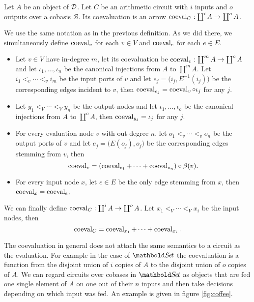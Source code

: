 \begin{definition}
  \label{def:coeval}
  Let $A$ be an object of $\mathcal{D}$.  Let $C$ be an arithmetic circuit with
  $i$ inputs and $o$ outputs over a cobasis $\mathcal{B}$. Its
  coevaluation is an arrow $\operatorname{coeval}_C:\coprod^iA\rightarrow\coprod^oA$.

  We use the same notation as in the previous definition. As we did
  there, we simultaneously define $\operatorname{coeval}_v$ for each $v\in V$ and
  $\operatorname{coeval}_e$ for each $e\in E$.
  \begin{itemize}
  \item Let $v\in V$ have in-degree $m$, let its coevaluation be
    $\operatorname{coeval}_v:\coprod^mA\rightarrow\coprod^oA$ and let $\iota_1,\ldots,\iota_n$ be the
    canonical injections from $A$ to $\coprod^mA$. Let $i_1<_v\cdots<_vi_m$
    be the input ports of $v$ and let
    $e_j=\bigl(i_j,E^{-1}(i_j)\bigr)$ be the corresponding edges
    incident to $v$, then $\operatorname{coeval}_{e_j} = \operatorname{coeval}_v\circ\iota_j$ for any
    $j$.
  \item Let $y_1<_V\cdots<_Vy_n$ be the output nodes and let
    $\iota_1,\ldots,\iota_o$ be the canonical injections from $A$ to
    $\coprod^oA$, then $\operatorname{coeval}_{y_j}=\iota_j$ for any $j$.
  \item For every evaluation node $v$ with out-degree $n$, let
    $o_1<_v\cdots<_vo_n$ be the output ports of $v$ and let
    $e_j=\bigl(E(o_j),o_j\bigr)$ be the corresponding edges
    stemming from $v$, then
    \begin{equation}
      \label{eq:lave_v}
      \operatorname{coeval}_v = (\operatorname{coeval}_{e_1}+\cdots+\operatorname{coeval}_{e_n}) \circ \beta(v) 
      \text{.}
    \end{equation}
  \item For every input node $x$, let $e\in E$ be the only edge
    stemming from $x$, then $\operatorname{coeval}_x=\operatorname{coeval}_e$.
  \end{itemize}

  We can finally define $\operatorname{coeval}_C:\coprod^iA\rightarrow\coprod^oA$. Let
  $x_1<_V\cdots<_Vx_i$ be the input nodes, then
  \begin{equation}
    \label{eq:lave}
    \operatorname{coeval}_C = \operatorname{coeval}_{x_1}+\cdots+\operatorname{coeval}_{x_i}
    \text{.}
  \end{equation}
\end{definition}

The coevaluation in general does not attach the same semantics to a
circuit as the evaluation. For example in the case of $\Set$
the coevaluation is a function from the disjoint union of $i$ copies
of $A$ to the disjoint union of $o$ copies of $A$. We can regard
circuits over cobases in $\Set$ as objects that are fed one
single element of $A$ on one out of their $n$ inputs and then take
decisions depending on which input was fed. An example is given in
figure \ref{fig:coffee}.


